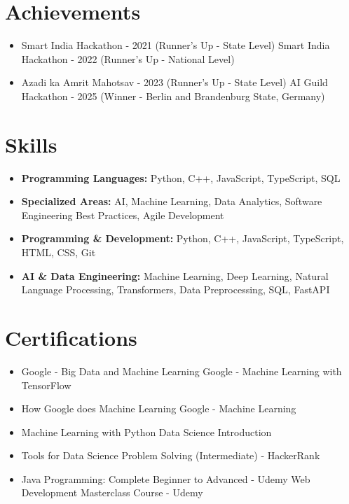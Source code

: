 \documentclass[a4paper,10pt]{article}
\begin{document}
\section*{Achievements}
\begin{itemize}
\item Smart India Hackathon - 2021 (Runner's Up - State Level) \hfill Smart India Hackathon - 2022 (Runner's Up - National Level)
\item Azadi ka Amrit Mahotsav - 2023 (Runner's Up - State Level) \hfill AI Guild Hackathon - 2025 (Winner - Berlin and Brandenburg State, Germany)
\end{itemize}

\section*{Skills}
\begin{itemize}
  \item \textbf{Programming Languages:} Python, C++, JavaScript, TypeScript, SQL
  \item \textbf{Specialized Areas:} AI, Machine Learning, Data Analytics, Software Engineering Best Practices, Agile Development
  \item \textbf{Programming \& Development:} Python, C++, JavaScript, TypeScript, HTML, CSS, Git
  \item \textbf{AI \& Data Engineering:} Machine Learning, Deep Learning, Natural Language Processing, Transformers, Data Preprocessing, SQL, FastAPI
\end{itemize}

\section*{Certifications}
\begin{itemize}
\item Google - Big Data and Machine Learning \hfill Google - Machine Learning with TensorFlow
\item How Google does Machine Learning \hfill Google - Machine Learning
\item Machine Learning with Python \hfill Data Science Introduction
\item Tools for Data Science \hfill Problem Solving (Intermediate) - HackerRank
\item Java Programming: Complete Beginner to Advanced - Udemy \hfill Web Development Masterclass Course - Udemy
\end{itemize}
\end{document}

